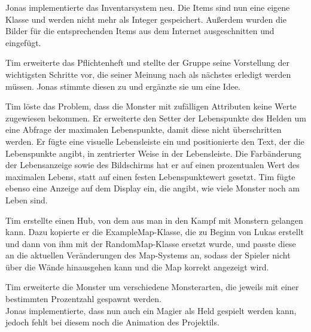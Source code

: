 
Jonas implementierte das Inventarsystem neu. Die Items sind nun eine eigene Klasse und werden nicht mehr als Integer gespeichert. Außerdem wurden die Bilder für die entsprechenden Items aus dem Internet ausgeschnitten und eingefügt. \\


Tim erweiterte das Pflichtenheft und stellte der Gruppe seine Vorstellung der wichtigsten Schritte vor, die seiner Meinung nach als nächstes erledigt werden müssen. Jonas stimmte diesen zu und ergänzte sie um eine Idee. \\


Tim löste das Problem, dass die Monster mit zufälligen Attributen keine Werte zugewiesen bekommen. Er erweiterte den Setter der Lebenspunkte des Helden um eine Abfrage der maximalen Lebenspunkte, damit diese nicht überschritten werden. Er fügte eine visuelle Lebensleiste ein und positionierte den Text, der die Lebenspunkte angibt, in zentrierter Weise in der Lebensleiste. Die Farbänderung der Lebensanzeige sowie des Bildschirms hat er auf einen prozentualen Wert des maximalen Lebens, statt auf einen festen Lebenspunktewert gesetzt. Tim fügte ebenso eine Anzeige auf dem Display ein, die angibt, wie viele Monster noch am Leben sind. \\


Tim erstellte einen \glqq{}Hub\grqq{}, von dem aus man in den Kampf mit Monstern gelangen kann. Dazu kopierte er die ExampleMap-Klasse, die zu Beginn von Lukas erstellt und dann von ihm mit der RandomMap-Klasse ersetzt wurde, und passte diese an die aktuellen Veränderungen des Map-Systems an, sodass der Spieler nicht über die Wände hinausgehen kann und die Map korrekt angezeigt wird. \\


Tim erweiterte die Monster um verschiedene Monsterarten, die jeweils mit einer bestimmten Prozentzahl gespawnt werden. \\
Jonas implementierte, dass nun auch ein Magier als Held gespielt werden kann, jedoch fehlt bei diesem noch die Animation des Projektils.\\



